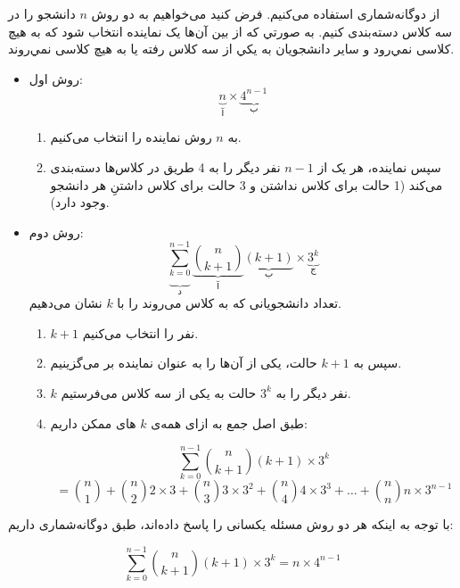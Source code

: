 \p
از دوگانه‌شماری استفاده می‌کنیم.
فرض کنید می‌خواهیم به دو روش  
 $n$ 
 دانشجو را در سه کلاس دسته‌بندی کنیم. 
 به صورتي كه از بین آن‌ها یک نماینده انتخاب شود که به هیچ کلاسی نمي‌رود و 
 ساير دانشجویان به يكي از سه كلاس رفته يا به هيچ کلاسی نمي‌روند.
\begin{itemize}
\item 
  روش اول:
  \[\underbrace{n}_{\text{آ}}\times\underbrace{4^{n-1}}_{\text{ب}}\] 
  \begin{enumerate}
    \item  
    \p
    به 
    $n$ 
    روش نماینده را انتخاب می‌کنیم.
    \p
    \item 
    \p
    سپس نماینده، هر یک از 
    $n-1$ 
    نفر دیگر را به 4 طریق در کلاس‌ها دسته‌بندی می‌کند 
    (1 حالت برای کلاس نداشتن و 3 حالت برای کلاس داشتنِ هر دانشجو وجود دارد).
  \end{enumerate}

\item 
 روش دوم:
   \[\underbrace{\sum\limits_{k=0}^{n-1}}_{\text{د}}\underbrace{\binom{n}{k+1}}_{\text{آ}}\underbrace{(k+1)}_{\text{ب}}\times\underbrace{3^{k}}_{\text{ج}}\] 
    تعداد دانشجویانی که به کلاس می‌روند را با 
    $k$ نشان می‌دهیم.
    \begin{enumerate}
    \item
    \p
    $k+1$
    نفر را انتخاب می‌کنیم.
    \item
    \p
    سپس به 
     $k+1$
    حالت، یکی از آن‌ها را به عنوان نماینده بر می‌گزینیم.
    \item
    \p
    $k$
    نفر دیگر را به
     $3^{k}$ 
    حالت به یکی از سه کلاس می‌فرستیم.
    \item
    \p
     طبق اصل جمع به ازای همه‌ی 
     $k$
     های ممکن داریم:    
    
     $$\sum\limits_{k=0}^{n-1}\binom{n}{k+1}(k+1)\times3^{k}$$
     $$= \binom{n}{1} + \binom{n}{2} 2\times3 + \binom{n}{3} 3\times3^2 +\binom{n}{4} 4\times3^3 +\ldots +\binom{n}{n} n\times3^{n-1}$$ 
    \end{enumerate}
\end{itemize}
\p
با توجه به اینکه هر دو روش مسئله یکسانی را پاسخ داده‌اند، طبق دوگانه‌شماری داریم:

$$\sum\limits_{k=0}^{n-1}\binom{n}{k+1}(k+1)\times3^{k} = n\times4^{n-1}$$
